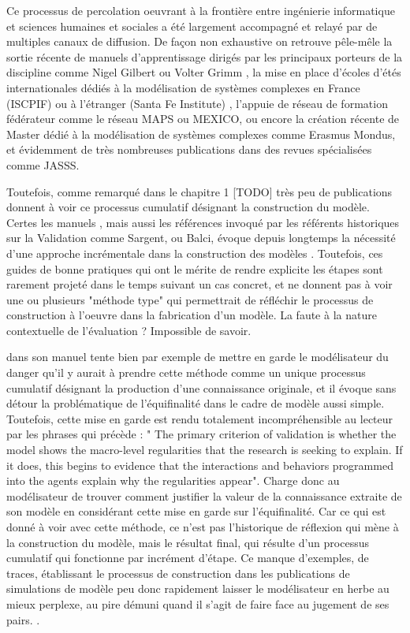 Ce processus de percolation oeuvrant à la frontière entre ingénierie informatique et sciences humaines et sociales a été largement accompagné et relayé par de multiples canaux de diffusion.  De façon non exhaustive on retrouve pêle-mêle la sortie récente de manuels d'apprentissage dirigés par les principaux porteurs de la discipline comme Nigel Gilbert \autocite{Gilbert2008} ou Volter Grimm \autocite{Grimm2011}, la mise en place d'écoles d'étés internationales dédiés à la modélisation de systèmes complexes en France (ISCPIF) ou à l'étranger (Santa Fe Institute) , l'appuie de réseau de formation fédérateur comme le réseau MAPS ou MEXICO, ou encore la création récente de Master dédié à la modélisation de systèmes complexes comme Erasmus Mondus, et évidemment de très nombreuses publications dans des revues spécialisées comme JASSS.

Toutefois, comme remarqué dans le chapitre 1 [TODO] très peu de publications donnent à voir ce processus cumulatif désignant la construction du modèle. Certes les manuels \autocite{Gilbert2008} \autocite{Grimm2011}, mais aussi les références invoqué par les référents historiques sur la Validation comme Sargent, ou Balci, évoque depuis longtemps la nécessité d'une approche incrémentale dans la construction des modèles \autocite[32]{Gilbert2008}. Toutefois, ces guides de bonne pratiques qui ont le mérite de rendre explicite les étapes sont rarement projeté dans le temps suivant  un cas concret, et ne donnent pas à voir une ou plusieurs "méthode type" qui permettrait de réfléchir le processus de construction à l'oeuvre dans la fabrication d'un modèle. La faute à la nature contextuelle de l'évaluation ? Impossible de savoir.  

\autocite{Gilbert2008} dans son manuel tente bien par exemple de mettre en garde le modélisateur du danger qu'il y aurait à prendre cette méthode comme un unique processus cumulatif désignant la production d'une connaissance originale, et il évoque sans détour la problématique de l'équifinalité \autocite[31-32]{Gilbert2008} dans le cadre de modèle aussi simple. Toutefois, cette mise en garde est rendu totalement incompréhensible au lecteur par les phrases qui précède : " The primary criterion of validation is whether the model shows the macro-level regularities that the research is seeking to explain. If it does, this begins to evidence that the interactions and behaviors programmed into the agents explain why the regularities appear". Charge donc au modélisateur de trouver comment justifier la valeur de la connaissance extraite de son modèle en considérant cette mise en garde sur l'équifinalité. Car ce qui est donné à voir avec cette méthode, ce n'est pas l'historique de réflexion qui mène à la construction du modèle, mais le résultat final, qui résulte d'un processus cumulatif qui fonctionne par incrément d'étape. Ce manque d'exemples, de traces, établissant le processus de construction dans les publications de simulations de modèle peu donc rapidement laisser le modélisateur en herbe au mieux perplexe, au pire démuni quand il s'agit de faire face au jugement de ses pairs. \autocite{Manzo2007a}.   

